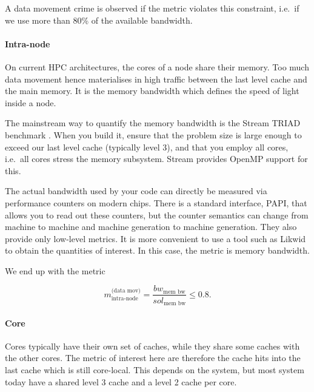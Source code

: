 \noindent
A data movement crime is observed if the metric violates this constraint,
i.e.~if we use more than 80\% of the available bandwidth.


\paragraph*{Intra-node}

On current HPC architectures, the cores of a node share their memory. 
Too much data movement hence materialises in high traffic between the last level
cache and the main memory.
It is the memory bandwidth which defines the speed of light inside a node.


The mainstream way to quantify the memory bandwidth is the Stream TRIAD
benchmark \cite{McCalpin:2024:Stream}.
When you build it, ensure that the problem size is large enough to exceed our
last level cache (typically level 3), and that you employ all cores, i.e.~all
cores stress the memory subsystem. 
Stream provides OpenMP support for this.


The actual bandwidth used by your code can directly be measured via performance
counters on modern chips. 
There is a standard interface, PAPI, that allows you to read out these counters,
but the counter semantics can change from machine to machine and machine
generation to machine generation.
They also provide only low-level metrics.
It is more convenient to use a tool such as Likwid \cite{Treibig:2024:Likwid} to
obtain the quantities of interest.
In this case, the metric is memory bandwidth.

We end up with the metric

\begin{equation}
m^{\text{(data mov)}}_{\text{intra-node}} = \frac{bw_{\text{mem bw}} }{
sol_{\text{mem bw}} } \leq 0.8.
  \label{equation:performance-assessment:memory-bandwidth}
\end{equation}



\paragraph*{Core}

Cores typically have their own set of caches, while they share some caches with
the other cores. 
The metric of interest here are therefore the cache hits into the last cache
which is still core-local.
This depends on the system, but most system today have a shared level 3 cache
and a level 2 cache per core.


